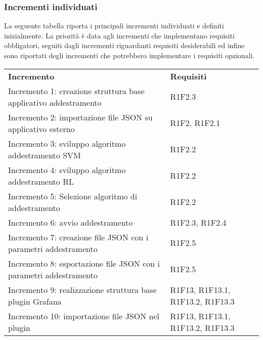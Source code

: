 \subsubsection{Incrementi individuati}
La seguente tabella riporta i principali incrementi individuati e definiti inizialmente. La priorità è data agli incrementi che implementano requisiti obbligatori, seguiti dagli incrementi riguardanti requisiti desiderabili ed infine sono riportati degli incrementi che potrebbero implementare i requisiti opzionali.
\begin{longtable} {
		>{\raggedright\arraybackslash}p{85mm}
		>{\raggedleft\arraybackslash}p{40mm}
	}
	\rowcolor{gray!50} 
	\textbf{Incremento} & 
	\textbf{Requisiti} 	\TBstrut \\
	
	Incremento 1: creazione struttura base applicativo addestramento &
	R1F2.3  \TBstrut \\ [2mm]		
	
	Incremento 2: importazione file JSON su applicativo esterno & 
	R1F2, R1F2.1  \TBstrut \\ [2mm]
	
	Incremento 3: sviluppo algoritmo addestramento SVM\glosp & 
	R1F2.2  \TBstrut \\ [2mm]
	
	Incremento 4: sviluppo algoritmo addestramento RL\glosp & 
	R1F2.2  \TBstrut \\ [2mm]
	
	Incremento 5: Selezione algoritmo di addestramento & 
	R1F2.2  \TBstrut \\ [2mm]
	
	Incremento 6: avvio addestramento & 
	R1F2.3, R1F2.4 \TBstrut \\ [2mm]
	
	Incremento 7: creazione file JSON con i parametri addestramento &
	R1F2.5 \TBstrut \\ [2mm]
	
	Incremento 8: esportazione file JSON con i parametri addestramento &
	R1F2.5 \TBstrut \\ [2mm]
	
	Incremento 9: realizzazione struttura base plugin Grafana\glosp &
	R1F13, R1F13.1, R1F13.2, R1F13.3 \TBstrut \\ [2mm]
	
	Incremento 10: importazione file JSON nel plugin &
	R1F13, R1F13.1, R1F13.2, R1F13.3 \TBstrut \\ [2mm]
	

\end{longtable}
